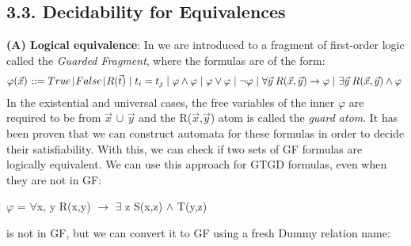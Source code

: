 \documentclass[11pt, a4paper, dvipsnames]{article}
\begin{document}
\subsection{3.3. Decidability for Equivalences}
\textbf{(A) Logical equivalence}:\newline
In \cite{decidable} we are introduced to a fragment of first-order logic called the \textit{Guarded Fragment}, where the formulas are of the form:
\begin{gather*}
\varphi(\vec{x}) \hspace{0.1em} ::= True \hspace{0.1em} | \hspace{0.1em} False \hspace{0.1em} | \hspace{0.1em} R(\vec{t}) \hspace{0.3em} |\hspace{0.3em} t_{i} = t_{j} \hspace{0.3em}| \hspace{0.3em}\varphi \wedge \varphi \hspace{0.3em}| \hspace{0.3em}\varphi \vee \varphi \hspace{0.3em}| \hspace{0.3em}\neg \varphi \hspace{0.3em}| \hspace{0.3em}\forall \vec{y} \hspace{0.25em} R(\vec{x}, \vec{y}) \rightarrow \varphi \hspace{0.3em}|\hspace{0.3em} \exists \vec{y} \hspace{0.25em} R(\vec{x}, \vec{y}) \wedge \varphi\hspace{0.3em}
\end{gather*}
In the existential and universal cases, the free variables of the inner $\varphi$ are required to be from $\vec{x}$ $\cup$ $\vec{y}$ and the R($\vec{x}$,$\vec{y}$) atom is called the \textit{guard atom}.\newline
It has been proven that we can construct automata for these formulas in order to decide their satisfiability. With this, we can check if two sets of GF formulas are logically equivalent. We can use this approach for GTGD formulas, even when they are not in GF:
\begin{center}
$\varphi$ = $\forall$x, y R(x,y) $\rightarrow$ $\exists$ z S(x,z) $\wedge$ T(y,z)
\end{center}
is not in GF, but we can convert it to GF using a fresh Dummy relation name:
\end{document}
